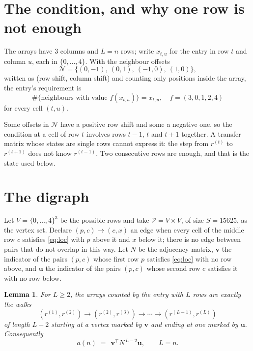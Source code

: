 \documentclass[11pt,a4paper]{article}
\theoremstyle{plain}
\newtheorem{lemma}[theorem]{Lemma}
\theoremstyle{definition}
\begin{document}
\section{The condition, and why one row is not enough}

The arrays have $3$ columns and $L=n$ rows; write $x_{t,u}$ for the entry in
row $t$ and column $u$, each in $\{0,\dots,4\}$. With the neighbour offsets
\[
\mathcal N=\{(0,-1),\ (0,1),\ (-1,0),\ (1,0)\},
\]
written as (row shift, column shift) and counting only positions inside the array, the
entry's requirement is
\begin{equation}\label{eq:loc}
\#\{\text{neighbours with value }f(x_{t,u})\}=x_{t,u},\quad f=(3,0,1,2,4)
\end{equation}
for every cell $(t,u)$.

Some offsets in $\mathcal N$ have a positive row shift and some a negative one, so the
condition at a cell of row $t$ involves rows $t-1$, $t$ and $t+1$ together. A transfer
matrix whose states are single rows cannot express it: the step from $r^{(t)}$ to
$r^{(t+1)}$ does not know $r^{(t-1)}$. Two consecutive rows are enough, and that is
the state used below.

\section{The digraph}

Let $V=\{0,\dots,4\}^{3}$ be the possible rows and take
$\mathcal V=V\times V$, of size $S=15625$, as the vertex set. Declare $(p,c)\to(c,x)$ an edge
when every cell of the middle row $c$ satisfies \eqref{eq:loc} with $p$ above it and $x$
below it; there is no edge between pairs that do not overlap in this way. Let $N$ be the
adjacency matrix, $\mathbf{v}$ the indicator of the pairs $(p,c)$ whose first row $p$
satisfies \eqref{eq:loc} with no row above, and $\mathbf{u}$ the indicator of
the pairs $(p,c)$ whose second row $c$ satisfies it with no row below.

\begin{lemma}\label{lem:walk}
For $L\ge2$, the arrays counted by the entry with $L$ rows are exactly the walks
\[
(r^{(1)},r^{(2)})\to(r^{(2)},r^{(3)})\to\cdots\to(r^{(L-1)},r^{(L)})
\]
of length $L-2$ starting at a vertex marked by $\mathbf{v}$ and ending at one marked by
$\mathbf{u}$. Consequently
\[
a(n)\;=\;\,\mathbf{v}^{\!\top}N^{\,L-2}\mathbf{u},\qquad L=n .
\]
\end{lemma}
\end{document}
